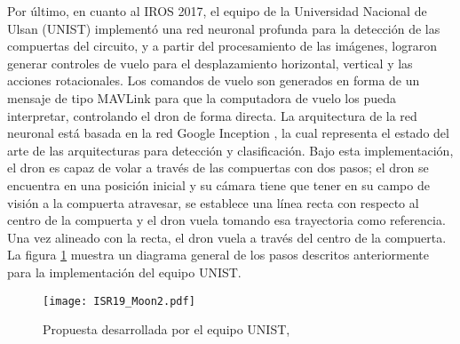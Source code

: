 Por último, en cuanto al IROS 2017, el equipo de la Universidad Nacional de Ulsan (UNIST) implementó una red neuronal profunda para la detección de las compuertas del circuito, y a partir del procesamiento de las imágenes, lograron generar controles de vuelo para el desplazamiento horizontal, vertical y las acciones rotacionales. Los comandos de vuelo son generados en forma de un mensaje de tipo MAVLink para que la computadora de vuelo los pueda interpretar, controlando el dron de forma directa.
La arquitectura de la red neuronal está basada en la red Google Inception \citet{xia2017inception}, la cual representa el estado del arte de las arquitecturas para detección y clasificación. 
Bajo esta implementación, el dron es capaz de volar a través de las compuertas con dos pasos; el dron se encuentra en una posición inicial y su cámara tiene que tener en su campo de visión a la compuerta atravesar, se establece una línea recta con respecto al centro de la compuerta y el dron vuela tomando esa trayectoria como referencia. Una vez alineado con la recta, el dron vuela a través del centro de la compuerta. La figura \ref{fig:ISR19_Moon2} muestra un diagrama general de los pasos descritos anteriormente para la implementación del equipo UNIST.

\begin{figure}[ht]
    \centering
    \texttt{[image: ISR19\_Moon2.pdf]}
    \caption{Propuesta desarrollada por el equipo UNIST, \citet{moon2017iros}}
    \label{fig:ISR19_Moon2}
\end{figure}


